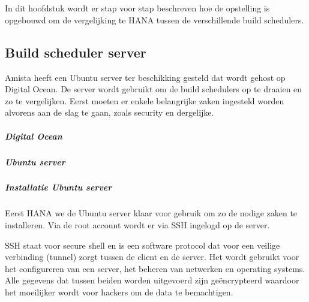 
\chapter{}
\label{ch:voorbeeldapplicatie}
In dit hoofdstuk wordt er stap voor stap beschreven hoe de opstelling is opgebouwd om de vergelijking te HANA tussen de verschillende build schedulers.

    \section{Build scheduler server}
    \label{sec:build-scheduler-server}
    Amista heeft een Ubuntu server ter beschikking gesteld dat wordt gehost op Digital Ocean. De server wordt gebruikt om de build schedulers op te draaien en zo te vergelijken. Eerst moeten er enkele belangrijke zaken ingesteld worden alvorens aan de slag te gaan, zoals security en dergelijke.
    
        \paragraph{Digital Ocean}
        
        \paragraph{Ubuntu server}
        
        \paragraph{Installatie Ubuntu server}
        Eerst HANA we de Ubuntu server klaar voor gebruik om zo de nodige zaken te installeren.
        Via de root account wordt er via SSH ingelogd op de server. 
        
        SSH staat voor secure shell en is een software protocol dat voor een veilige verbinding (tunnel) zorgt tussen de client en de server. Het wordt gebruikt voor het configureren van een server, het beheren van netwerken en operating systems. Alle gegevens dat tussen beiden worden uitgevoerd zijn geëncrypteerd waardoor het moeilijker wordt voor hackers om de data te bemachtigen.
        
